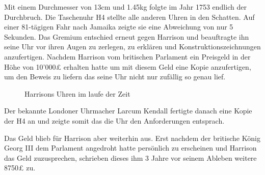\begin{refsection}
Mit einem Durchmesser von 13cm und 1.45kg folgte im Jahr 1753 endlich der Durchbruch.
Die Taschenuhr H4 stellte alle anderen Uhren in den Schatten. Auf einer 81-tägigen Fahr nach Jamaika zeigte sie eine Abweichung von nur 5 Sekunden.
Das Gremium entschied erneut gegen Harrison und beauftragte ihn seine Uhr vor ihren Augen zu zerlegen, zu erklären und Konstruktionszeichnungen anzufertigen.
Nachdem Harrison vom britischen Parlament ein Preisgeld in der Höhe von 10’000£ erhalten hatte um mit diesem Geld eine Kopie anzufertigen, um den Beweis zu liefern das seine Uhr nicht nur zufällig so genau lief.
\begin{figure}[!htb]
\centering
\quad \quad
\centering
\quad \quad
\centering
\caption{Harrisons Uhren im laufe der Zeit} 
\end{figure}
Der bekannte Londoner Uhrmacher Larcum Kendall fertigte danach eine Kopie der H4 an und zeigte somit das die Uhr den Anforderungen entsprach.

Das Geld blieb für Harrison aber weiterhin aus. Erst nachdem der britische König Georg III dem Parlament angedroht hatte persönlich zu erscheinen und Harrison das Geld zuzusprechen, schrieben dieses ihm 3 Jahre vor seinem Ableben weitere 8750£ zu.


\end{refsection}
